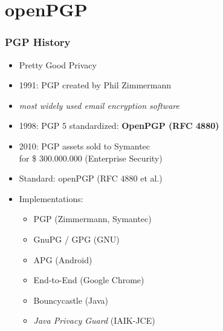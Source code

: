 \documentclass{beamer}
\begin{document}
\section{openPGP}


\begin{frame}
	\frametitle{PGP History}

	\begin{itemize}
		\item Pretty Good Privacy
		\item 1991: PGP created by Phil Zimmermann 
		\item \textit{most widely used email encryption software} \cite{zimmermann}
		\item 1998: PGP 5 standardized: \textbf{OpenPGP (RFC 4880)}
		\item 2010: PGP assets sold to Symantec \\ for \$ 300.000.000 (Enterprise Security)
	\end{itemize}
	

\end{frame}



\begin{frame}

	\begin{itemize}
		\item Standard: openPGP (RFC 4880 et al.)
		\item Implementations:
		\begin{itemize}
			\item PGP (Zimmermann, Symantec)
			\item GnuPG / GPG (GNU)
			\item APG (Android)
			\item End-to-End (Google Chrome)
			\item Bouncycastle (Java)
			\item \textit{Java Privacy Guard} (IAIK-JCE)
		\end{itemize}
	\end{itemize}

\end{frame}
\end{document}
